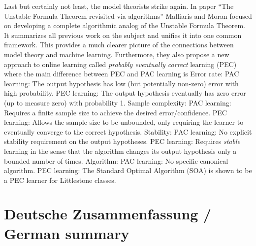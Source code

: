 \begin{outline}
    \1 Last but certainly not least, the model theorists strike again. In paper \enquote{The Unstable Formula Theorem revisited via algorithms} Malliaris and Moran focused on developing a complete algorithmic analog of the Unstable Formula Theorem. It summarizes all previous work on the subject and unifies it into one common framework. This provides a much clearer picture of the connections between model theory and machine learning. Furthermore, they also propose a new approach to online learning called \emph{probably eventually correct} learning (PEC) where the main difference between PEC and PAC learning is 
        \2 Error rate: 
            \3 PAC learning: The output hypothesis has low (but potentially non-zero) error with high probability.
            \3 PEC learning: The output hypothesis eventually has zero error (up to measure zero) with probability 1.
        \2 Sample complexity:
            \3 PAC learning: Requires a finite sample size to achieve the desired error/confidence.
            \3 PEC learning: Allows the sample size to be unbounded, only requiring the learner to eventually converge to the correct hypothesis.
        \2 Stability:
            \3 PAC learning: No explicit stability requirement on the output hypotheses.
            \3 PEC learning: Requires \emph{stable} learning in the sense that the algorithm changes its output hypothesis only a bounded number of times.
        \2 Algorithm:
            \3 PAC learning: No specific canonical algorithm.
            \3 PEC learning: The Standard Optimal Algorithm (SOA) is shown to be a PEC learner for Littlestone classes.
\end{outline}

\newpage 
{}
\printbibliography

\newpage 
{}
\section*{Deutsche Zusammenfassung / German summary}


